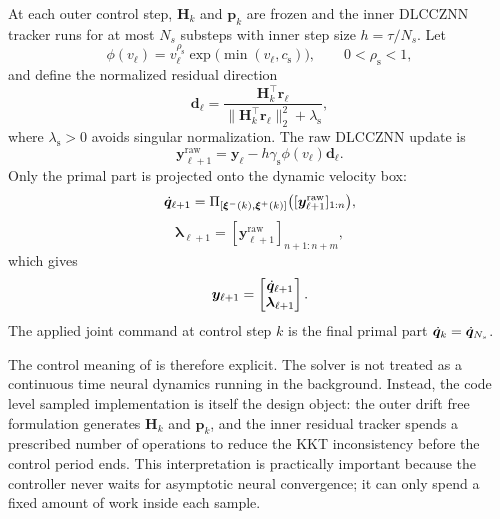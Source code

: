 At each outer control step, $\bm{H}_k$ and $\bm{p}_k$ are frozen and the inner DLCCZNN tracker runs for at most $N_s$ substeps with inner step size $h = \tau / N_s$. Let
\begin{equation}
  \phi(v_\ell)
  =
  v_\ell^{\rho_{\mathrm{s}}}
  \exp\!\bigl(\min(v_\ell,c_{\mathrm{s}})\bigr),
  \qquad
  0 < \rho_{\mathrm{s}} < 1,
  \label{eq:method2_phi}
\end{equation}
and define the normalized residual direction
\begin{equation}
  \bm{d}_\ell
  =
  \frac{\bm{H}_k^\top \bm{r}_\ell}
  {\|\bm{H}_k^\top \bm{r}_\ell\|_2^2 + \lambda_{\mathrm{s}}},
  \label{eq:method2_direction}
\end{equation}
where $\lambda_{\mathrm{s}} > 0$ avoids singular normalization. The raw DLCCZNN update is
\begin{equation}
  \bm{y}_{\ell+1}^{\mathrm{raw}}
  =
  \bm{y}_\ell
  -
  h \gamma_{\mathrm{s}} \phi(v_\ell)\bm{d}_\ell.
  \label{eq:method2_raw_update}
\end{equation}
Only the primal part is projected onto the dynamic velocity box:
\begin{equation}
  \dot{\bm{q}}_{\ell+1}
  =
  \Pi_{[\bm{\xi}^{-}(k),\bm{\xi}^{+}(k)]}
  \bigl([\bm{y}_{\ell+1}^{\mathrm{raw}}]_{1:n}\bigr),
  \label{eq:method2_primal_proj}
\end{equation}
\begin{equation}
  \bm{\lambda}_{\ell+1}
  =
  [\bm{y}_{\ell+1}^{\mathrm{raw}}]_{n+1:n+m},
\end{equation}
which gives
\begin{equation}
  \bm{y}_{\ell+1}
  =
  \begin{bmatrix}
    \dot{\bm{q}}_{\ell+1} \\
    \bm{\lambda}_{\ell+1}
  \end{bmatrix}.
  \label{eq:method2_final_update}
\end{equation}
The applied joint command at control step $k$ is the final primal part $\dot{\bm{q}}_k = \dot{\bm{q}}_{N_s}$.

The control meaning of \methodtwoDL{} is therefore explicit. The solver is not treated as a continuous time neural dynamics running in the background. Instead, the code level sampled implementation is itself the design object: the outer drift free formulation generates $\bm{H}_k$ and $\bm{p}_k$, and the inner residual tracker spends a prescribed number of operations to reduce the KKT inconsistency before the control period ends. This interpretation is practically important because the controller never waits for asymptotic neural convergence; it can only spend a fixed amount of work inside each sample.

